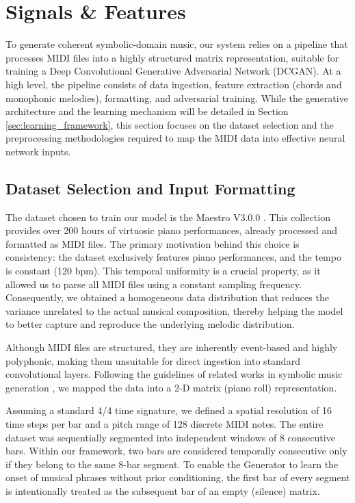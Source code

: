 
\section{Signals \& Features}
\label{sec:signals_features}

To generate coherent symbolic-domain music, our system relies on a pipeline that processes MIDI files into a highly structured matrix representation, suitable for training a Deep Convolutional Generative Adversarial Network (DCGAN).
At a high level, the pipeline consists of data ingestion, feature extraction (chords and monophonic melodies), formatting, and adversarial training.
While the generative architecture and the learning mechanism will be detailed in Section \ref{sec:learning_framework}, this section focuses on the dataset selection and the preprocessing methodologies required to map the MIDI data into effective neural network inputs.

\subsection{Dataset Selection and Input Formatting}
The dataset chosen to train our model is the Maestro V3.0.0 \cite{Maestro-V3}. This collection provides over 200 hours of virtuosic piano performances, already processed and formatted as MIDI files.
The primary motivation behind this choice is consistency: the dataset exclusively features piano performances, and the tempo is constant (120 bpm).
This temporal uniformity is a crucial property, as it allowed us to parse all MIDI files using a constant sampling frequency.
Consequently, we obtained a homogeneous data distribution that reduces the variance unrelated to the actual musical composition, thereby helping the model to better capture and reproduce the underlying melodic distribution.

Although MIDI files are structured, they are inherently event-based and highly polyphonic, making them unsuitable for direct ingestion into standard convolutional layers.
Following the guidelines of related works in symbolic music generation \cite{Yang-2017}, we mapped the data into a 2-D matrix (piano roll) representation.

Assuming a standard 4/4 time signature, we defined a spatial resolution of 16 time steps per bar and a pitch range of 128 discrete MIDI notes.
The entire dataset was sequentially segmented into independent windows of 8 consecutive bars.
Within our framework, two bars are considered temporally consecutive only if they belong to the same 8-bar segment.
To enable the Generator to learn the onset of musical phrases without prior conditioning, the first bar of every segment is intentionally treated as the subsequent bar of an empty (silence) matrix.

